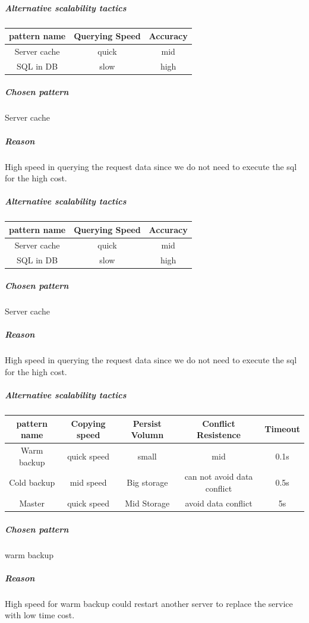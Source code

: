\documentclass{article}
\begin{document}
					\subparagraph{Alternative scalability tactics}
					\begin{center}
						\begin{tabular}{|c|c|c|}
							\hline
							pattern name & Querying Speed & Accuracy\\
							\hline
							Server cache & quick & mid\\
							\hline
							SQL in DB & slow & high\\
							\hline
						\end{tabular}
					\end{center}
					\subparagraph{Chosen pattern} 
					Server cache
					\subparagraph{Reason} 
					High speed in querying the request data since we do not need to execute the sql for the high cost.
					\subparagraph{Alternative scalability tactics}
					\begin{center}
						\begin{tabular}{|c|c|c|}
							\hline
							pattern name & Querying Speed & Accuracy\\
							\hline
							Server cache & quick & mid\\
							\hline
							SQL in DB & slow & high\\
							\hline
						\end{tabular}
					\end{center}
					\subparagraph{Chosen pattern} 
					Server cache
					\subparagraph{Reason} 
					High speed in querying the request data since we do not need to execute the sql for the high cost.
			
					\subparagraph{Alternative scalability tactics}
					\begin{center}
						\begin{tabular}{|c|c|c|c|c|}
							\hline
							pattern name & Copying speed & Persist Volumn & Conflict Resistence & Timeout\\
							\hline
							Warm backup & quick speed & small & mid & 0.1s\\
							\hline
							Cold backup & mid speed & Big storage & can not avoid data conflict & 0.5s\\
							\hline
							Master	& quick speed & Mid Storage & avoid data conflict & 5s\\
							\hline
						\end{tabular}
					\end{center}
					\subparagraph{Chosen pattern} 
					warm backup
					\subparagraph{Reason} 
					High speed for warm backup could restart another server to replace the service with low time cost.
\end{document}
